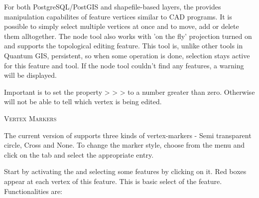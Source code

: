 
For both PostgreSQL/PostGIS and shapefile-based layers, the
 provides manipulation capabilites
of feature vertices similar to CAD programs. It is possible to simply select
multiple vertices at once and to move, add or delete them alltogether. The node
tool also works with 'on the fly' projection turned on and supports
the topological editing feature. This tool is, unlike other tools in Quantum GIS,
persistent, so when some operation is done, selection stays active for this
feature and tool. If the node tool couldn't find any features, a warning will be
displayed.

Important is to set the property  >
 >
> to a number greater than
zero. Otherwise \qg will not be able to tell which vertex is being edited.

\begin{Tip}\caption{\textsc{Vertex Markers}}
The current version of \qg supports three kinds of vertex-markers -
Semi transparent circle, Cross and None. To change the marker style, choose
 from the  menu
and click on the  tab and select the appropriate entry.
\end{Tip}


Start by activating the  and selecting
some features by clicking on it. Red boxes appear at each vertex of this feature.
This is basic select of the feature. Functionalities are:

